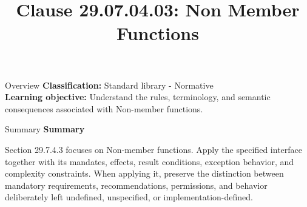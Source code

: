 \documentclass[10pt,letterpaper]{article}
\title{Clause 29.07.04.03: Non Member Functions}
\author{}
\date{}
\begin{document}
\maketitle
\begin{CornellOverviewBox}{Overview}
\textbf{Classification:} Standard library - Normative\\[2pt]
\textbf{Learning objective:} Understand the rules, terminology, and semantic consequences associated with Non-member functions.
\end{CornellOverviewBox}\begin{CornellSummaryBox}{Summary}
{\sffamily\bfseries\color{Accent} Summary}\par\vspace{3pt}Section 29.7.4.3 focuses on Non-member functions. Apply the specified interface together with its mandates, effects, result conditions, exception behavior, and complexity constraints. When applying it, preserve the distinction between mandatory requirements, recommendations, permissions, and behavior deliberately left undefined, unspecified, or implementation-defined.
\end{CornellSummaryBox}
\end{document}
